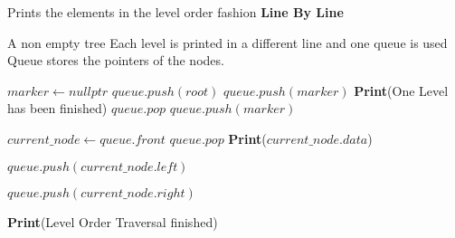\documentclass[12pt]{article}
\begin{document}
\begin{algorithm}

  \caption{Prints the elements in the level order fashion \textbf{Line By Line}}
  \begin{algorithmic}[1]
    \Require A non empty tree
    \Ensure Each level is printed in a different line and one queue is used
    \Statex
        \LeftComment Queue stores the pointers of the nodes.
        
        \Statex
        \State $marker \gets nullptr$
        \State $queue.push(root)$
        \State $queue.push(marker)$
                \State \textbf{Print}(One Level has been finished)
                \State $queue.pop$
                    \State $queue.push(marker)$
                \EndIf
            \EndIf
            
            \State $current\_node\gets queue.front $
            \State $queue.pop$
            \State \textbf{Print}($current\_node.data$)
            
                \State $queue.push(current\_node.left)$
            \EndIf
            
                \State $queue.push(current\_node.right)$
            \EndIf
            
        \EndWhile
        \Statex
        \State \textbf{Print}(Level Order Traversal finished)
    \EndFunction
  \end{algorithmic}
  
\end{algorithm}
\end{document}

